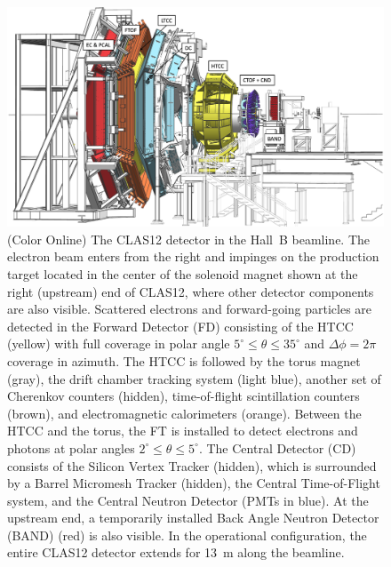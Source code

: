 \documentclass[final,3p,twocolumn]{elsarticle}
\begin{document}
\begin{figure}[t]
\centering
\centerline{\includegraphics[width=1.8\columnwidth]{CLAS12-side.png}}
\caption{(Color Online) The CLAS12 detector in the Hall~B beamline. The electron beam enters from the right and impinges on
the production target located in the center of the solenoid magnet shown at the right (upstream) end of CLAS12,
where other detector components are also visible. Scattered electrons and forward-going particles are detected
in the Forward Detector (FD) consisting of the HTCC (yellow) with full coverage in polar angle
$5^\circ \le \theta \le 35^\circ$ and $\Delta \phi = 2\pi$ coverage in azimuth. The HTCC is followed by the
torus magnet (gray), the drift chamber tracking system (light blue), another set of Cherenkov counters (hidden),
time-of-flight scintillation counters (brown), and electromagnetic calorimeters (orange). Between the HTCC and the
torus, the FT is installed to detect electrons and photons at polar angles $2^\circ \le \theta \le 5^\circ$. The Central
Detector (CD) consists of the Silicon Vertex Tracker (hidden), which is surrounded by a Barrel Micromesh Tracker
(hidden), the Central Time-of-Flight system, and the Central Neutron Detector (PMTs in blue). At the upstream end,
a temporarily installed Back Angle Neutron Detector (BAND) (red) is also visible. In the operational configuration,
the entire CLAS12 detector extends for 13~m along the beamline.} 
\label{clas12}
\end{figure}
\end{document}
